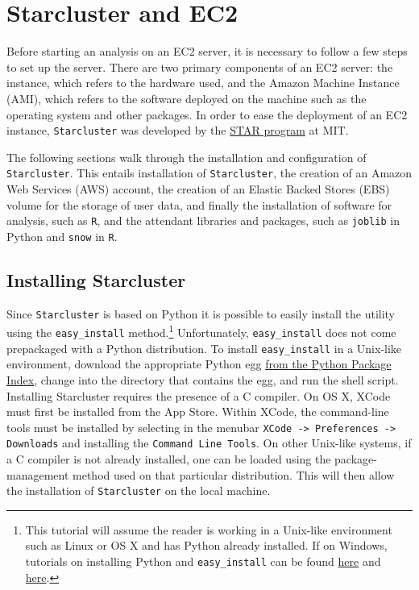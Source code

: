 \documentclass[12pt, letterpaper]{article}
\newcommand{\R}{\texttt{R}} %
\begin{document}
\section*{Starcluster and EC2}

Before starting an analysis on an EC2 server, it is necessary to follow a few
steps to set up the server. There are two primary components of an EC2 server: the instance, which 
refers to the hardware used, and the Amazon Machine Instance (AMI), which refers 
to the software deployed on the machine such as the operating system and other 
packages. In order to ease the deployment of an EC2 instance, \texttt{Starcluster}
was developed by the \href{http://star.mit.edu/}{STAR program} at MIT.

The following sections walk through the installation
and configuration of \texttt{Starcluster}. This entails installation of \texttt{Starcluster}, 
the creation of an Amazon Web Services (AWS) account, the creation of an Elastic Backed
Stores (EBS) volume for the storage of user data, and finally the installation of software for 
analysis, such as \R, and the attendant libraries and packages, such as \texttt{joblib} in Python
and \texttt{snow} in \R. 

\subsection*{Installing Starcluster}

Since \texttt{Starcluster} is based on Python it is possible to easily install the utility using the \texttt{easy\_install}
method.\footnote{This tutorial will assume the reader is working in a Unix-like
environment such as Linux or OS X and has Python already installed. If on Windows, tutorials on installing Python and \texttt{easy\_install} 
can be found  \href{http://www.python.org/getit/}{here} and \href{http://pypi.python.org/pypi/setuptools\#windows}{here}.}
Unfortunately, \texttt{easy\_install} does not come prepackaged with a Python distribution.
To install \texttt{easy\_install} in a Unix-like environment, download the 
appropriate Python egg \href{http://pypi.python.org/pypi/setuptools#files}{from the Python Package Index}, 
change into the directory that contains the egg, and run the shell script. Installing Starcluster requires the
presence of a C compiler. On OS X, XCode must first be installed from the App Store. Within XCode, the command-line
tools must be installed by selecting in the menubar \texttt{XCode -> Preferences -> Downloads} and installing the \texttt{Command 
Line Tools}. On other Unix-like systems, if a C compiler
is not already installed, one can be loaded using the package-management method used on that particular distribution.
This will then allow the installation of \texttt{Starcluster} on the local machine.
\end{document}
